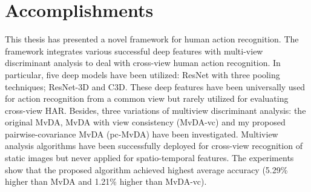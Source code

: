 
\section{Accomplishments}
    This thesis has presented a novel framework for human action recognition.
    The framework integrates various successful deep features with multi-view discriminant analysis to deal with cross-view human action recognition.
    In particular, five deep models have been utilized: ResNet with three pooling techniques; ResNet-3D and C3D.
    These deep features have been universally used for action recognition from a common view but rarely utilized for evaluating cross-view HAR.
    Besides, three variations of multiview discriminant analysis: the original MvDA, MvDA with view consistency (MvDA-vc) and my proposed pairwise-covariance MvDA (pc-MvDA) have been investigated.
    Multiview analysis algorithms have been successfully deployed for cross-view recognition of static images but never applied for spatio-temporal features.
    The experiments show that the proposed algorithm achieved highest average accuracy (5.29\% higher than MvDA and 1.21\% higher than MvDA-vc).
